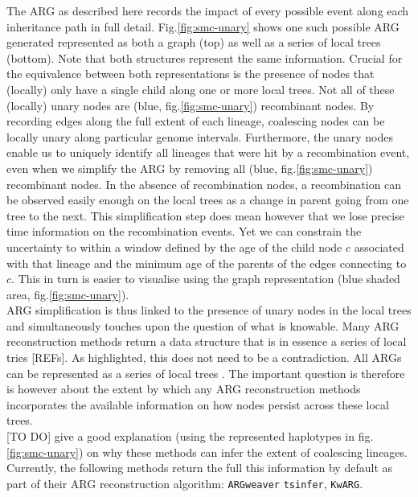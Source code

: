 \documentclass{article}
\newcommand{\tsinfer}[0]{\texttt{tsinfer}}
\newcommand{\kwarg}[0]{\texttt{KwARG}}
\newcommand{\argweaver}[0]{\texttt{ARGweaver}}
\begin{document}
The ARG as described here records the impact of every possible event along each 
inheritance path in full detail. Fig.\ref{fig:smc-unary} shows one such possible 
ARG generated represented 
as both a graph (top) as well as a series of local trees (bottom). 
Note that both structures represent the same information. 
Crucial for the equivalence between both representations is the presence of
nodes that (locally) only have a single child along one or more local 
trees. Not all of these (locally) unary nodes are 
(blue, fig.\ref{fig:smc-unary}) recombinant nodes. By recording edges along 
the full extent of each lineage, coalescing nodes can be locally unary 
along particular genome intervals. Furthermore, the unary nodes enable 
us to uniquely identify all lineages that were hit by a recombination 
event, even when we simplify the ARG by removing all 
(blue, fig.\ref{fig:smc-unary}) recombinant nodes. 
In the absence of recombination nodes, a recombination can be observed 
easily enough on the local trees as a change in parent going from 
one tree to the next. This simplification step 
does mean however that we lose precise time information on the 
recombination events. Yet we can constrain the uncertainty to 
within a window defined by the age of the child node $c$ associated 
with that lineage and the minimum age of the parents of the 
edges connecting to $c$. This in turn is easier to visualise using the 
graph representation (blue shaded area, fig.\ref{fig:smc-unary}).\\

ARG simplification is thus linked to the presence of unary nodes in 
the local trees and simultaneously touches upon the question of what is 
knowable. Many ARG reconstruction methods return a data structure that 
is in essence a series of local tries [REFs]. 
As highlighted, this does not need to be a contradiction. 
All ARGs can be represented as a series of local trees \citep{wong-2023}.
The important question is therefore is however about the extent by which any 
ARG reconstruction methods incorporates the available information 
on how nodes persist across these local trees.\\ 

[TO DO] give a good explanation (using the represented haplotypes 
in fig. \ref{fig:smc-unary}) on why these methods can infer the extent 
of coalescing lineages.
Currently, the following methods 
return the full this information by default as part of their ARG reconstruction algorithm: 
\argweaver \citep{rasmussen_genome-wide_2014} 
\tsinfer \citep{kelleher_inferring_2019}, 
\kwarg \citep{ignatieva_kwarg_2021}.\\
\end{document}
